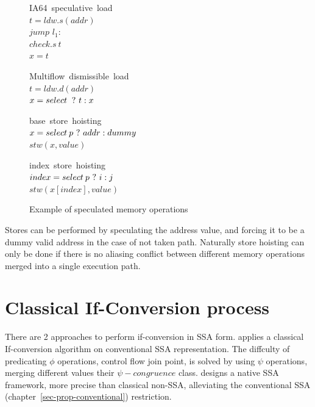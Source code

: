 \begin{figure}
\begin{minipage}[t]{4cm}
\mbox{IA64 speculative load} \\
$t = ldw.s(addr) $ \\
$jump$ $l_1:$ \\
$check.s\:t$ \\
$x = t$ \\
\end{minipage}
\begin{minipage}[t]{4cm}
\mbox{Multiflow dismissible load} \\
$t = ldw.d(addr) $ \\
$x = select\: ~?~ t : x $ \\
\end{minipage}

\begin{minipage}[t]{4cm}
\mbox{base store hoisting} \\
$x=select\:p ~?~ addr : dummy $ \\
$stw (x, value) $ \\
\end{minipage}
\begin{minipage}[t]{4cm}
\mbox{index store hoisting} \\
$index=select\:p ~?~ i : j $ \\
$stw (x[index], value) $ \\
\end{minipage}
\label{fig:spec}
\caption{Example of speculated memory operations}
\end{figure}

Stores can be performed by speculating the address value, and forcing it to be a dummy valid address in the case of not taken path. Naturally store hoisting can only be done if there is no aliasing conflict between different memory operations merged into a single execution path.

\section{Classical If-Conversion process}

There are 2 approaches to perform if-conversion in SSA form. \cite{Stoutchinin_Gao_2004} applies a classical \cite{Fang:1996:CAI:645674.663446} If-conversion algorithm on conventional SSA representation. The diffculty of predicating $\phi$ operations, control flow join point, is solved by using $\psi$ operations, merging different values their $\psi-congruence$ class. \cite{odes_bruel, ijes_bruel} designs a native SSA framework, more precise than classical non-SSA, alleviating the conventional SSA (chapter~\ref{sec-prop-conventional}) restriction.

